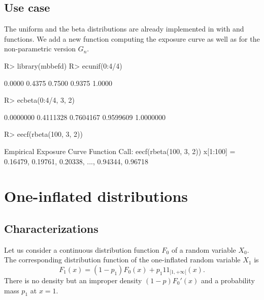 \documentclass[article, nojss]{jss}
\newcommand{\ind}{1\!\!1}
\begin{document}
\subsection{Use case}
The uniform and the beta distributions are already implemented in  
with  and   functions.
We add a new function computing the exposure curve as well as for the non-parametric version $G_n$.

\begin{Schunk}
\begin{Sinput}
R> library(mbbefd)
R> ecunif(0:4/4)
\end{Sinput}
\begin{Soutput}
[1] 0.0000 0.4375 0.7500 0.9375 1.0000
\end{Soutput}
\begin{Sinput}
R> ecbeta(0:4/4, 3, 2)
\end{Sinput}
\begin{Soutput}
[1] 0.0000000 0.4111328 0.7604167 0.9599609 1.0000000
\end{Soutput}
\begin{Sinput}
R> eecf(rbeta(100, 3, 2))
\end{Sinput}
\begin{Soutput}
Empirical Exposure Curve Function 
Call: eecf(rbeta(100, 3, 2))
 x[1:100] = 0.16479, 0.19761, 0.20338,  ..., 0.94344, 0.96718
\end{Soutput}
\end{Schunk}



\section{One-inflated distributions}\label{sec:oidistr:generic}

\subsection{Characterizations}\label{sec:oidistr:generic:charac}
Let us consider a continuous distribution function $F_0$ of a random variable $X_0$. 
The corresponding distribution function of the one-inflated random variable $X_1$ is 
$$
F_1(x) = (1-p_1) F_0(x) + p_1 \ind_{[1,+\infty[}(x).
$$
There is no density but an improper density $(1-p)F_0'(x)$ and a probability mass $p_1$ at $x=1$.


\end{document}
